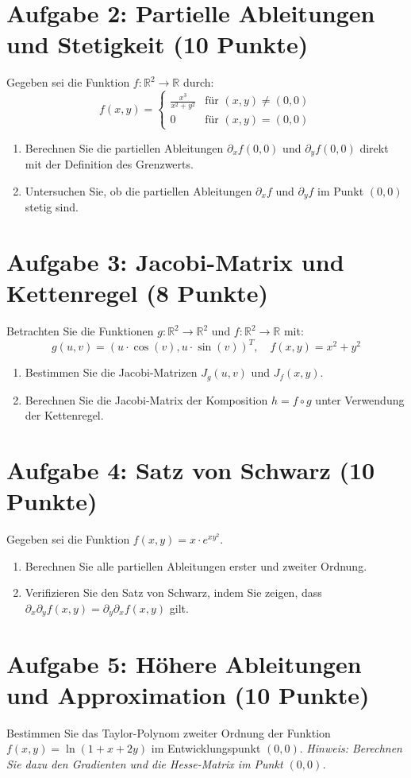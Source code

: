 \newpage

\section*{Aufgabe 2: Partielle Ableitungen und Stetigkeit (10 Punkte)}
Gegeben sei die Funktion $f: \mathbb{R}^2 \to \mathbb{R}$ durch:
\[
f(x, y) = 
\begin{cases} 
\frac{x^3}{x^2 + y^2} & \text{für } (x, y) \neq (0,0) \\
0 & \text{für } (x, y) = (0,0)
\end{cases}
\]
\begin{enumerate}
    \item Berechnen Sie die partiellen Ableitungen $\partial_x f(0,0)$ und $\partial_y f(0,0)$ direkt mit der Definition des Grenzwerts.
    \item Untersuchen Sie, ob die partiellen Ableitungen $\partial_x f$ und $\partial_y f$ im Punkt $(0,0)$ stetig sind.
\end{enumerate}

\newpage

\section*{Aufgabe 3: Jacobi-Matrix und Kettenregel (8 Punkte)}
Betrachten Sie die Funktionen $g: \mathbb{R}^2 \to \mathbb{R}^2$ und $f: \mathbb{R}^2 \to \mathbb{R}$ mit:
\[ g(u, v) = (u \cdot \cos(v), u \cdot \sin(v))^T, \quad f(x, y) = x^2 + y^2 \]
\begin{enumerate}
    \item Bestimmen Sie die Jacobi-Matrizen $J_g(u, v)$ und $J_f(x, y)$.
    \item Berechnen Sie die Jacobi-Matrix der Komposition $h = f \circ g$ unter Verwendung der Kettenregel.
\end{enumerate}

\newpage

\section*{Aufgabe 4: Satz von Schwarz (10 Punkte)}
Gegeben sei die Funktion $f(x, y) = x \cdot e^{xy^2}$.
\begin{enumerate}
    \item Berechnen Sie alle partiellen Ableitungen erster und zweiter Ordnung.
    \item Verifizieren Sie den Satz von Schwarz, indem Sie zeigen, dass $\partial_x \partial_y f(x, y) = \partial_y \partial_x f(x, y)$ gilt.
\end{enumerate}

\newpage

\section*{Aufgabe 5: Höhere Ableitungen und Approximation (10 Punkte)}
Bestimmen Sie das Taylor-Polynom zweiter Ordnung der Funktion $f(x, y) = \ln(1 + x + 2y)$ im Entwicklungspunkt $(0,0)$. 
\textit{Hinweis: Berechnen Sie dazu den Gradienten und die Hesse-Matrix im Punkt $(0,0)$.}